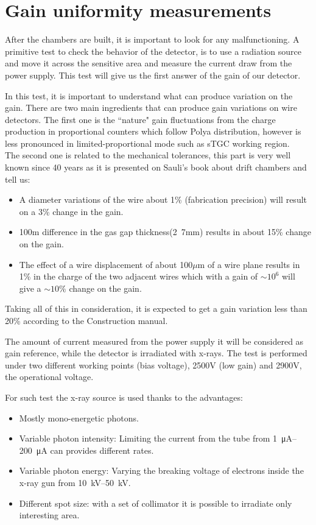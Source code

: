 \section{Gain uniformity measurements}

After the chambers are built, it is important to look for any malfunctioning. A primitive test to check the behavior of
the detector, is to use a radiation source and move it across the sensitive area and measure the current draw from the
power supply. This test will give us the first answer of the gain of our detector.\par
In this test, it is important to understand what can produce variation on the gain. There are two main ingredients that can produce gain variations on wire
detectors. The first one is the ``nature" gain fluctuations from the charge production in proportional counters which
follow Polya distribution, however is less pronounced in limited-proportional mode such as sTGC working region.\\
The second one is related to the mechanical tolerances, this part is very well known since 40 years as it is presented on
Sauli's book \cite{sauli} about drift chambers and tell us:
\begin{itemize}
\item A diameter variations of the wire about 1\% (fabrication precision) will result on a 3\% change in the gain.
\item  \unit{100}{\micro m} difference in the gas gap thickness(\unit{2.7}{mm}) results in about 15\% change on the gain.
\item The effect of a wire displacement of about \unit{100}{$\mu$m}
of a wire plane results in 1\% in the charge of the two adjacent wires which with a gain of $\sim10^6$ will give a
$\sim10\%$ change on the gain.
\end{itemize}
Taking all of this in consideration, it is expected to get a gain variation less than 20\% according to the
Construction manual\cite{mann}.\par

The amount of current measured from the power supply it will be considered as gain reference, while the detector is
irradiated with x-rays. The test is performed under two different working points (bias voltage), 2500V (low gain) and
2900V, the operational voltage.\par

For such test the x-ray source is used thanks to the advantages:\par
\begin{itemize}[noitemsep, topsep=0pt, parsep=0pt, partopsep=2pt]
	\item Mostly mono-energetic photons.
	\item Variable photon intensity: Limiting the current from the tube from \SIrange{1}{200}{\micro A} can provides different rates.
	\item Variable photon energy: Varying the breaking voltage of electrons inside the x-ray gun from
	\SIrange{10}{50}{kV}.
	\item Different spot size: with a set of collimator it is possible to irradiate only interesting area.
\end{itemize}


